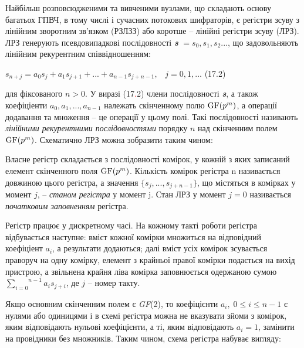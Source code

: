 \documentclass[a4paper]{article}
\newcounter{}
\newcommand\normalsubformula[1]{\text{\mathversion{normal}$#1$}}
\begin{document}
Найбільш розповсюдженими та вивченими вузлами, що складають основу багатьох
ГПВЧ, в тому числі і сучасних потокових шифраторів, є регістри зсуву з лінійним
зворотним зв’язком (РЗЛЗЗ) або коротше – лінійні регістри зсуву (ЛРЗ). ЛРЗ
генерують псевдовипадкові послідовності \textbf{\textit{s}}
${=s_{{0}},s_{{1}},s_{{2}}\text{.}\text{.}\text{.}}$, що задовольняють лінійним
рекурентним співвідношенням:

{\raggedleft

${s_{{n+j}}=a_{{0}}s_{{j}}+a_{{1}}s_{{j+1}}+\text{.}\text{.}\text{.}+a_{{n-1}}s_{{j+n-1}},\;\;\;j=0,1,\text{.}\text{.}\text{.}}$
 (17.2)
\par}

для фіксованого  ${n>0}$. У виразі (17\textcolor{red}{.}2) члени послідовності
\textbf{\textit{s}}, а також коефіціенти 
${a_{{0}},a_{{1}},\text{.}\text{.}\text{.},a_{{n-1}}}$ належать скінченному
полю  ${\normalsubformula{\text{GF}}(p^{{m}})}$, а операції додавання та
множення – це операції у цьому полі. Такі послідовності називають
\textit{лінійними рекурентними послідовностями} порядку  ${n}$ над скінченним
полем  ${\normalsubformula{\text{GF}}(p^{{m}})}$. Схематично ЛРЗ можна
зобразити таким чином:

{\par}


\bigskip

Власне регістр складається з послідовності комірок, у кожній з яких записаний
елемент скінченного поля  ${\normalsubformula{\text{GF}}(p^{{m}})}$. Кількість
комірок регістра n називається довжиною цього регістра, а значення 
${\{s_{{j}},\text{.}\text{.}\text{.},s_{{j+n-1}}\}}$, що містяться в комірках у
момент  ${j}$, –  \textit{станом регістра} у момент j. Стан ЛРЗ у момент 
${j=0}$ називається \textit{початковим заповненням}\textbf{ }регістра.

Регістр працює у дискретному часі. На кожному такті роботи регістра відбувається
наступне: вміст кожної комірки множиться на відповідний коефіціент 
${a_{{i}}}$, а результати додаються; далі вміст усіх комірок зсувається
праворуч на одну комірку, елемент з крайньої правої комірки подається на вихід
пристрою, а звільнена крайня ліва комірка заповнюється одержаною сумою 
${\overset{{n-1}}{\underset{{i=0}}{\sum }}{a_{{i}}s_{{j+i}}}}$, де  ${j}$ –
номер такту.

Якщо основним скінченним полем є \textit{GF}(2), то коефіцієнти 
${a_{{i}},\;0\le i\le n-1}$ є нулями або одиницями і в схемі регістра можна не
вказувати зйоми з комірок, яким відповідають нульові коефіцієнти, а ті, яким
відповідають  ${a_{{i}}=1}$, замінити на провідники без множників. Таким чином,
схема регістра набуває вигляду:
\end{document}
